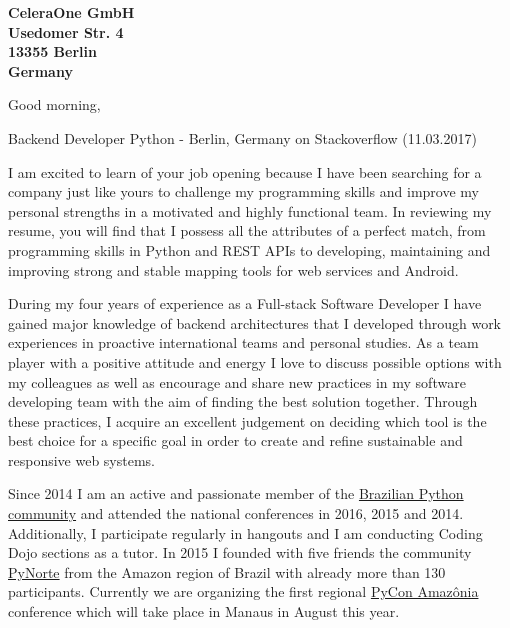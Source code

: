 \documentclass[a4paper]{joaosoares-letter}
\begin{document}
\longindentation=0pt


\begin{letter}{\bfseries CeleraOne GmbH\\Usedomer Str. 4 \\13355 Berlin\\Germany}


\date{Belém, \today}

\opening{Good morning,}{Backend Developer Python - Berlin, Germany on Stackoverflow (11.03.2017)}

I am excited to learn of your job opening because I have been searching for a company just like yours to challenge my programming skills and improve my personal strengths in a motivated and highly functional team. In reviewing my resume, you will find that I possess all the attributes of a perfect match, from programming skills in Python and REST APIs to developing, maintaining and improving strong and stable mapping tools for web services and Android.

During my four years of experience as a Full-stack Software Developer I have gained major knowledge of backend architectures that I developed through work experiences in proactive international teams and personal studies. As a team player with a positive attitude and energy I love to discuss possible options with my colleagues as well as encourage and share new practices in my software developing team with the aim of finding the best solution together. Through these practices, I acquire an excellent judgement on deciding which tool is the best choice for a specific goal in order to create and refine sustainable and responsive web systems.

Since 2014 I am an active and passionate member of the \href{http://python.org.br}{Brazilian Python community} and attended the national conferences in 2016, 2015 and 2014. Additionally, I participate regularly in hangouts and I am conducting Coding Dojo sections as a tutor. In 2015 I founded with five friends the community \href{http://pynorte.python.org.br}{PyNorte} from the Amazon region of Brazil with already more than 130 participants. Currently we are organizing the first regional \href{http://amazonia.python.org.br/}{PyCon Amazônia} conference which will take place in Manaus in August this year.


\end{letter}
\end{document}
